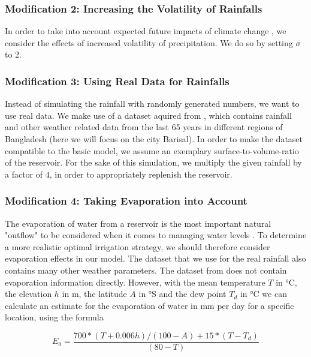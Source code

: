 \documentclass[12pt, a4paper, oneside]{article}
\begin{document}
\subsubsection{Modification 2: Increasing the Volatility of Rainfalls}
In order to take into account expected future impacts of climate change \citep{guhathakurta2011impact}, we consider the effects of increased volatility of precipitation. %
We do so by setting $\sigma$ to 2. %

\subsubsection{Modification 3: Using Real Data for Rainfalls}
Instead of simulating the rainfall with randomly generated numbers, we want to use real data. 
We make use of a dataset aquired from \citep{kaggle:2019}, which contains rainfall and other weather related data from the last 65 years in different regions of Bangladesh (here we will focus on the city Barisal). %
In order to make the dataset compatible to the basic model, we assume an exemplary surface-to-volume-ratio of the reservoir. For the sake of this simulation, we multiply the given rainfall by a factor of $4$, in order to appropriately replenish the reservoir. 

\subsubsection{Modification 4: Taking Evaporation into Account} \label{sec:intro-mod4}
The evaporation of water from a reservoir is the most important natural "outflow" to be considered when it comes to managing water levels \citep{tanny2008evaporation}. 
To determine a more realistic optimal irrigation strategy, we should therefore consider evaporation effects in our model. 
The dataset that we use for the real rainfall also contains many other weather parameters.
The dataset from \citep{kaggle:2019} does not contain evaporation information directly. However, with the mean temperature $T$ in °C, the elevation $h$ in m, the latitude $A$ in °S and the dew point $T_d$ in °C we can calculate an estimate for the evaporation of water in mm per day for a specific location, using the formula \citep{linacre1977simple}

\begin{equation}
	{E_0} = \frac{700 * (T + 0.006h) / (100 - A) + 15 * (T - T_d)}{(80 - T)}
\end{equation}
\end{document}
